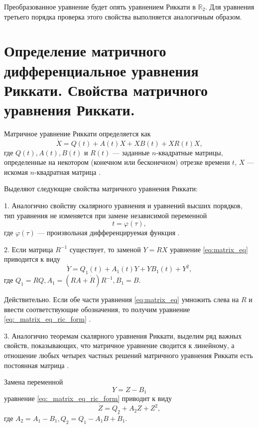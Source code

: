 Преобразованное уравнение будет опять уравнением Риккати в $\mathbb{R}_2$. Для уравнения третьего порядка проверка этого свойства выполняется аналогичным образом.
\section{Определение матричного дифференциальное уравнения Риккати. Свойства матричного уравнения Риккати.}
Матричное уравнение Риккати определяется как
\begin{equation} \label{eq:matrix_eq}
    \dot X = Q(t) + A(t)X + X B(t) + X R(t) X,
\end{equation}
где $Q(t), A(t), B(t)$ и $R(t)$ --- заданные $n$-квадратные матрицы, определенные на некотором (конечном или бесконечном) отрезке времени $t$, $X$ --- искомая $n$-квадратная матрица \cite{egorov}.

Выделяют следующие свойства матричного уравнения Риккати:

1. Аналогично свойству скалярного уравнения и уравнений высших порядков, тип уравнения не изменяется при замене независимой переменной
\begin{equation}
    t = \varphi(\tau),
\end{equation}
где $\varphi(\tau)$ --- произвольная дифференцируемая функция \cite{egorov}.

2. Если матрица $R^{-1}$ существует, то заменой $Y = RX$ уравнение \eqref{eq:matrix_eq} приводится к виду
\begin{equation} \label{eq:_matrix_eq_ric_form}
    \dot Y = Q_1 (t) + A_1(t) Y + Y B_1(t) + Y^2,
\end{equation}
где $Q_1 = RQ, A_1 = (RA + \dot R) R^{-1}, B_1 = B.$

Действительно. Если обе части уравнения \eqref{eq:matrix_eq} умножить слева на $R$ и ввести соответствующие обозначения, то получим уравнение \eqref{eq:_matrix_eq_ric_form} \cite{egorov}.

3. Аналогично теоремам скалярного уравнения Риккати, выделим ряд важных свойств, показывающих, что матричное уравнение сводится к линейному, а отношение любых четырех частных решений матричного уравнения Риккати есть постоянная матрица \cite{egorov}.

Замена переменной
\begin{equation}
    Y = Z - B_1
\end{equation}
уравнение \eqref{eq:_matrix_eq_ric_form} приводит к виду
\begin{equation}
    \dot Z = Q_2 + A_2 Z + Z^2,
\end{equation}
где $A_2 = A_1 - B_1, Q_2 = Q_1 - A_1 B + \dot B_1.$

